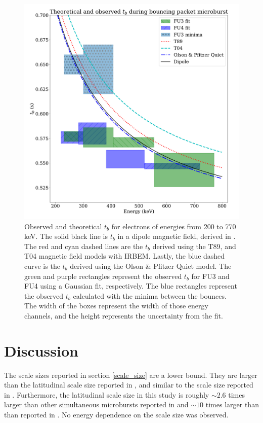 \documentclass[draft,linenumbers]{agujournal}
\begin{document}
\begin{figure}
\includegraphics[width=\textwidth]{detrended_bounce_period_boxed_adj.pdf}
\caption{Observed and theoretical $t_b$ for electrons of energies from 200 to 770 keV. The solid black line is $t_b$ in a dipole magnetic field, derived in \citet{Schulz74}. The red and cyan dashed lines are the $t_b$ derived using the T89, and T04 magnetic field models with IRBEM. Lastly, the blue dashed curve is the $t_b$ derived using the Olson \& Pfitzer Quiet model. The green and purple rectangles represent the observed $t_b$ for FU3 and FU4 using a Gaussian fit, respectively. The blue rectangles represent the observed $t_b$ calculated with the minima between the bounces. The width of the boxes represent the width of those energy channels, and the height represents the uncertainty from the fit.}
\label{tb_plot}
\end{figure}

\section{Discussion} \label{discussion}
The scale sizes reported in section \ref{scale_size} are a lower bound. They are larger than the latitudinal scale size reported in \citet{Blake96}, and similar to the scale size reported in \citet{Parks1967}. Furthermore, the latitudinal scale size in this study is roughly $\sim 2.6$ times larger than other simultaneous microbursts reported in \citet{Crew16} and $\sim 10$ times larger than than reported in \citet{Dietrich10}. No energy dependence on the scale size was observed.
\end{document}
